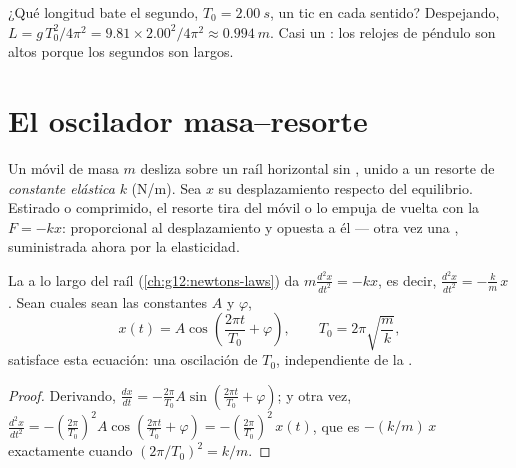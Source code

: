 \begin{example}\label{ex:g12:oscillators-and-time:seconds}
¿Qué longitud bate el segundo, $T_0 = \qty{2.00}{s}$, un tic en cada sentido?
Despejando, $L = g\,T_0^2/4\pi^2 = 9.81 \times 2.00^2/4\pi^2 \approx \qty{0.994}{m}$.
Casi un : los relojes de péndulo son altos porque los segundos son largos.
\end{example}

\section{El oscilador masa--resorte}

\begin{definition}\label{def:g12:oscillators-and-time:spring}
Un móvil de masa $m$ desliza sobre un raíl horizontal sin , unido a un
resorte de \emph{constante elástica} $k$ (\unit{N/m}). Sea
$x$ su desplazamiento respecto del equilibrio. Estirado o comprimido, el resorte tira
del móvil o lo empuja de vuelta con la  $F = -kx$: proporcional al
desplazamiento y opuesta a él --- otra vez una , suministrada ahora
por la elasticidad.
\end{definition}

\begin{proposition}\label{prop:g12:oscillators-and-time:spring-period}
La  a lo largo del raíl (\cref{ch:g12:newtons-laws}) da
$m \frac{d^2x}{dt^2} = -kx$, es decir, $\frac{d^2x}{dt^2} = -\frac{k}{m}\,x$. Sean
cuales sean las constantes $A$ y $\varphi$,
\[
x(t) = A \cos\!\left(\frac{2\pi t}{T_0} + \varphi\right),
\qquad T_0 = 2\pi\sqrt{\frac{m}{k}},
\]
satisface esta ecuación: una oscilación de  $T_0$, independiente de la
.
\end{proposition}

\begin{proof}
Derivando, $\frac{dx}{dt} = -\frac{2\pi}{T_0}A \sin(\frac{2\pi t}{T_0} + \varphi)$; y
otra vez, $\frac{d^2x}{dt^2} = -(\frac{2\pi}{T_0})^2 A\cos(\frac{2\pi t}{T_0} +
\varphi) = -(\frac{2\pi}{T_0})^2\,x(t)$, que es $-(k/m)\,x$ exactamente cuando
$(2\pi/T_0)^2 = k/m$.
\end{proof}

